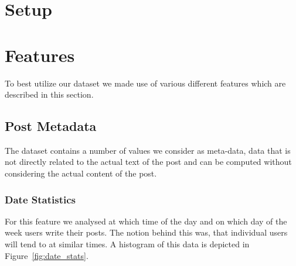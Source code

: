 \documentclass[acmsmall]{acmart}
\begin{document}
\section{Setup}


\section{Features}
To best utilize our dataset we made use of various different features which are described in this section. 

\subsection{Post Metadata}
The dataset contains a number of values we consider as meta-data, data that is not directly related to the actual text of the post and can be computed without considering the actual content of the post. 

\subsubsection{Date Statistics}
For this feature we analysed at which time of the day and on which day of the week users write their posts. 
The notion behind this was, that individual users will tend to at similar times.
A histogram of this data is depicted in Figure~\ref{fig:date_stats}.
\end{document}
